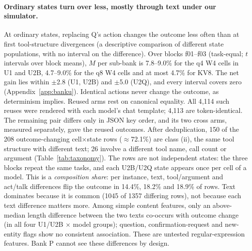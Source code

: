 \paragraph{Ordinary states turn over less, mostly through text under our simulator.} At ordinary states, replacing Q's action changes the outcome less often than at first tool-structure divergences (a descriptive comparison of different state populations, with no interval on the difference). Over blocks f01--f03 (task-equal; $t$ intervals over block means), $M$ per sub-bank is 7.8--9.0\% for the q4 W4 cells in U1 and U2B, 4.7--9.0\% for the q8 W4 cells and at most 4.7\% for KV8. The net gain lies within $\pm$2.8\pp{} (U1, U2B) and $\pm$5.0\pp{} (U2Q), and every interval covers zero (Appendix~\ref{app:banku}). %
Identical actions never change the outcome, as determinism implies. Reused arms rest on canonical equality. All 4{,}114 such reuses were rendered with each model's chat template; 4{,}113 are token-identical. The remaining pair differs only in JSON key order, and its two cross arms, measured separately, gave the reused outcomes. %
After deduplication, 150 of the 208 outcome-changing cell$\times$state rows ($\approx$72.1\%) are class (ii), the same tool structure with different text; 26 involve a different tool name, call count or argument (Table~\ref{tab:taxonomy}). %
The rows are not independent states: the three blocks repeat the same tasks, and each U2B/U2Q state appears once per cell of a model.
This is a \emph{composition share}: per instance, text, tool/argument and act/talk differences flip the outcome in 14.4\%, 18.2\% and 18.9\% of rows. Text dominates because it is common (1045 of 1357 differing rows), not because each text difference matters more. %
Among simple content features, only an above-median length difference between the two texts co-occurs with outcome change (in all four U1/U2B $\times$ model groups); question, confirmation-request and new-entity flags show no consistent association. These are untested regular-expression features. Bank P cannot see these differences by design. %

